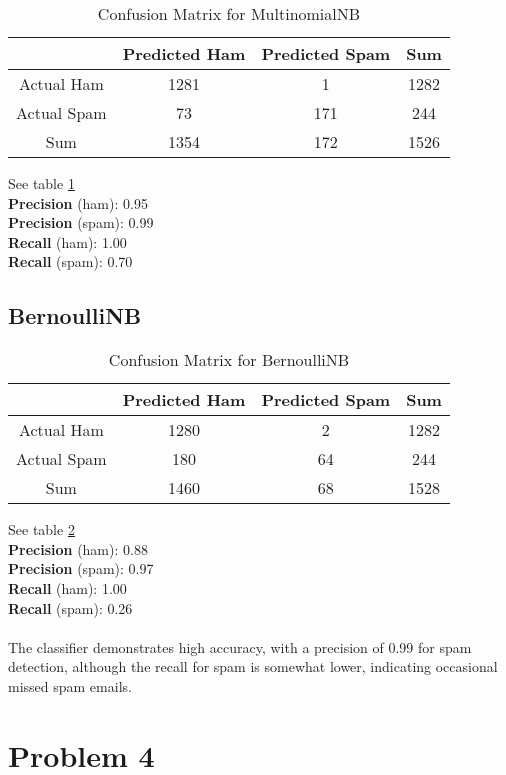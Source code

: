 \documentclass[a4paper]{article}
\begin{document}
\begin{table}[h!]
    \centering
    \begin{tabular}{|c|c|c|c|}
        \hline
        & Predicted Ham & Predicted Spam & Sum \\
        \hline
        Actual Ham & 1281 & 1 & 1282 \\
        \hline
        Actual Spam & 73 & 171 & 244 \\
        \hline
        Sum & 1354 & 172 & 1526 \\
        \hline
    \end{tabular}
    \caption{Confusion Matrix for MultinomialNB}
    \label{mNB}
\end{table}


See table \ref{mNB}\\
\textbf{Precision} (ham): 0.95 \\
\textbf{Precision} (spam): 0.99 \\
\textbf{Recall} (ham): 1.00 \\
\textbf{Recall} (spam): 0.70

\subsection*{BernoulliNB}
\begin{table}[h!]
	\centering
	\begin{tabular}{|c|c|c|c|}
		\hline
		& Predicted Ham & Predicted Spam & Sum \\
		\hline
		Actual Ham & 1280 & 2 & 1282 \\
		\hline
		Actual Spam & 180 & 64 & 244 \\
		\hline
		Sum & 1460 & 68 & 1528 \\
		\hline
	\end{tabular}
	\caption{Confusion Matrix for BernoulliNB}
	\label{bNB}
\end{table}
\noindent
See table \ref{bNB}\\
\textbf{Precision} (ham): 0.88 \\
\textbf{Precision} (spam): 0.97 \\
\textbf{Recall} (ham): 1.00 \\
\textbf{Recall} (spam): 0.26\\\\
The classifier demonstrates high accuracy, with a precision of 0.99 for spam detection, although the recall for spam is somewhat lower, indicating occasional missed spam emails.

\section*{Problem 4}
\end{document}
